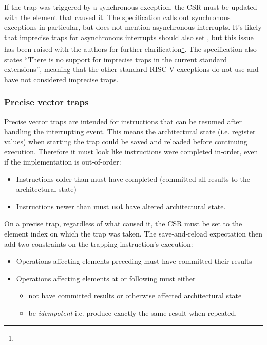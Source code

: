 If the trap was triggered by a synchronous exception, the  CSR must be updated with the element that caused it.
The specification calls out synchronous exceptions in particular, but does not mention asynchronous interrupts.
It's likely that imprecise traps for asynchronous interrupts should also set , but this issue has been raised with the authors for further clarification\footnote{}.
The specification also states \enquote{There is no support for imprecise traps in the current standard extensions}, meaning that the other standard RISC-V exceptions do not use and have not considered imprecise traps.

\subsubsection{Precise vector traps}
Precise vector traps are intended for instructions that can be resumed after handling the interrupting event.
This means the architectural state (i.e. register values) when starting the trap could be saved and reloaded before continuing execution.
Therefore it must look like instructions were completed in-order, even if the implementation is out-of-order:
\begin{itemize}
    \item Instructions older than  must have completed (committed all results to the architectural state)
    \item Instructions newer than  must \textbf{not} have altered architectural state.
\end{itemize}

On a precise trap, regardless of what caused it, the  CSR must be set to the element index on which the trap was taken.
The save-and-reload expectation then add two constraints on the trapping instruction's execution:
\begin{itemize}
    \item Operations affecting elements preceding  must have committed their results
    \item Operations affecting elements at or following  must either
    \begin{itemize}
        \item not have committed results or otherwise affected architectural state
        \item be \emph{idempotent} i.e. produce exactly the same result when repeated.
    \end{itemize}
\end{itemize}

